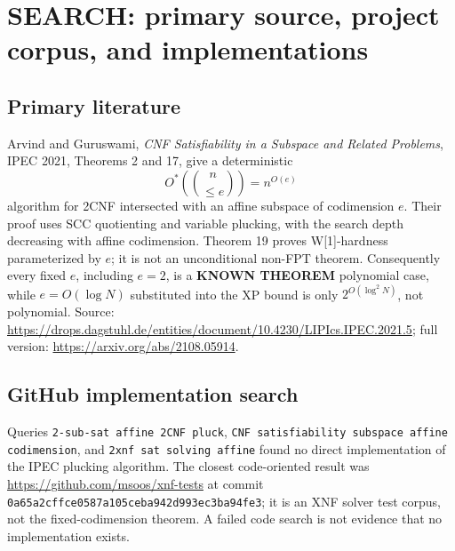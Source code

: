 \documentclass[10pt]{article}
\begin{document}
\section{SEARCH: primary source, project corpus, and implementations}

\subsection*{Primary literature}
Arvind and Guruswami, \emph{CNF Satisfiability in a Subspace and Related Problems}, IPEC 2021,
Theorems 2 and 17, give a deterministic
\[
  O^*\!\left(\binom{n}{\le e}\right)=n^{O(e)}
\]
algorithm for 2CNF intersected with an affine subspace of codimension $e$.  Their proof uses
SCC quotienting and variable plucking, with the search depth decreasing with affine
codimension.  Theorem 19 proves W[1]-hardness parameterized by $e$; it is not an unconditional
non-FPT theorem.  Consequently every fixed $e$, including $e=2$, is a \textbf{KNOWN THEOREM}
polynomial case, while $e=O(\log N)$ substituted into the XP bound is only
$2^{O(\log^2 N)}$, not polynomial.  Source:
\url{https://drops.dagstuhl.de/entities/document/10.4230/LIPIcs.IPEC.2021.5}; full version:
\url{https://arxiv.org/abs/2108.05914}.

\subsection*{GitHub implementation search}
Queries \texttt{2-sub-sat affine 2CNF pluck},
\texttt{CNF satisfiability subspace affine codimension}, and
\texttt{2xnf sat solving affine} found no direct implementation of the IPEC plucking algorithm.
The closest code-oriented result was \url{https://github.com/msoos/xnf-tests} at commit
\texttt{0a65a2cffce0587a105ceba942d993ec3ba94fe3}; it is an XNF solver test corpus, not the
fixed-codimension theorem.  A failed code search is not evidence that no implementation exists.
\end{document}
